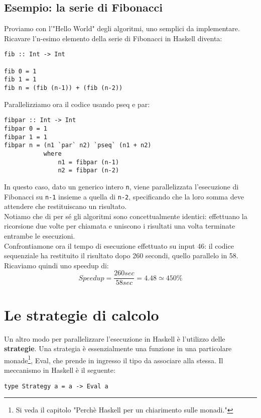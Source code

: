 \subsection{Esempio: la serie di Fibonacci}
Proviamo con l'"Hello World" degli algoritmi, uno semplici da implementare. Ricavare l'n-esimo elemento della serie di Fibonacci in Haskell diventa:
\begin{verbatim}
fib :: Int -> Int

fib 0 = 1
fib 1 = 1
fib n = (fib (n-1)) + (fib (n-2))
\end{verbatim}
Parallelizziamo ora il codice usando pseq e par:
\begin{verbatim}
fibpar :: Int -> Int
fibpar 0 = 1
fibpar 1 = 1
fibpar n = (n1 `par` n2) `pseq` (n1 + n2)
           where
               n1 = fibpar (n-1)
               n2 = fibpar (n-2)
\end{verbatim}
In questo caso, dato un generico intero \texttt{n}, viene parallelizzata l'esecuzione di Fibonacci su \texttt{n-1} insieme a quella di \texttt{n-2}, specificando che la loro somma deve attendere che restituiscano un risultato.\\
Notiamo che di per sé gli algoritmi sono concettualmente identici: effettuano la ricorsione due volte per chiamata e uniscono i risultati una volta terminate entrambe le esecuzioni.\\
Confrontiamone ora il tempo di esecuzione effettuato su input 46: il codice sequenziale ha restituito il risultato dopo 260 secondi, quello parallelo in 58. Ricaviamo quindi uno speedup di:
\begin{equation}
Speedup = \frac{260 sec}{58 sec} = 4.48 \simeq 450 \%
\end{equation} 
\newpage
\section{Le strategie di calcolo}
Un altro modo per parallelizzare l'esecuzione in Haskell è l'utilizzo delle \textbf{strategie}. Una strategia è essenzialmente una funzione in una particolare monade\footnote{Si veda il capitolo "Perchè Haskell per un chiarimento sulle monadi."}, Eval, che prende in ingresso il tipo da associare alla stessa. Il meccanismo in Haskell è il seguente:
\begin{verbatim}
type Strategy a = a -> Eval a
\end{verbatim}
